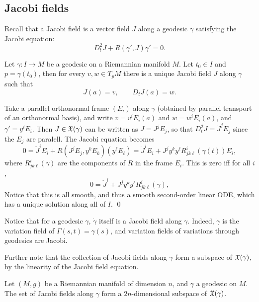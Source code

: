 \eproof

\subsection{Jacobi fields}

Recall that a {\emphcolor Jacobi field} is a vector field $J$ along a geodesic $\gamma$ satisfying the {\emphcolor Jacobi equation}:
$$ D_t^2J + R(\gamma',J)\gamma' = 0 . $$

\bprop

    Let $\gamma\colon I\to M$ be a geodesic on a Riemannian manifold $M$.
    Let $t_0\in I$ and $p=\gamma(t_0)$, then for every $v,w\in T_pM$ there is a unique Jacobi field $J$ along $\gamma$ such that
    $$ J(a) = v,\qquad D_tJ(a) = w . $$

\eprop

\bproof

    Take a parallel orthonormal frame $(E_i)$ along $\gamma$ (obtained by parallel transport of an orthonormal basis), and write
    $v=v^iE_i(a)$ and $w=w^iE_i(a)$, and $\gamma'=y^iE_i$.
    Then $J\in{\frak X}(\gamma)$ can be written as $J=J^jE_j$, so that $D_t^2J=\ddot J^jE_j$ since the $E_j$ are paralell.
    The Jacobi equation becomes
    $$ 0 = \ddot J^iE_i + R(J^jE_j,y^kE_k)(y^\ell E_\ell) = \ddot J^iE_i + J^jy^ky^\ell R_{jk\ell}^i(\gamma(t))E_i , $$
    where $R_{jk\ell}^i(\gamma)$ are the components of $R$ in the frame $E_i$.
    This is zero iff for all $i$,
    $$ 0 = \ddot J^i + J^jy^ky^\ell R_{jk\ell}^i(\gamma) , $$
    Notice that this is all smooth, and thus a smooth second-order linear ODE, which has a unique solution along all of $I$.
    \qed

\eproof

Notice that for a geodesic $\gamma$, $\dot\gamma$ itself is a Jacobi field along $\gamma$.
Indeed, $\dot\gamma$ is the variation field of $\Gamma(s,t)=\gamma(s)$, and variation fields of variations through geodesics are Jacobi.

Further note that the collection of Jacobi fields along $\gamma$ form a subspace of ${\frak X}(\gamma)$, by the linearity of the Jacobi field
equation.

\bcoro

    Let $(M,g)$ be a Riemannian manifold of dimension $n$, and $\gamma$ a geodesic on $M$.
    The set of Jacobi fields along $\gamma$ form a $2n$-dimensional subspace of ${\frak X}(\gamma)$.

\ecoro

\bproof

